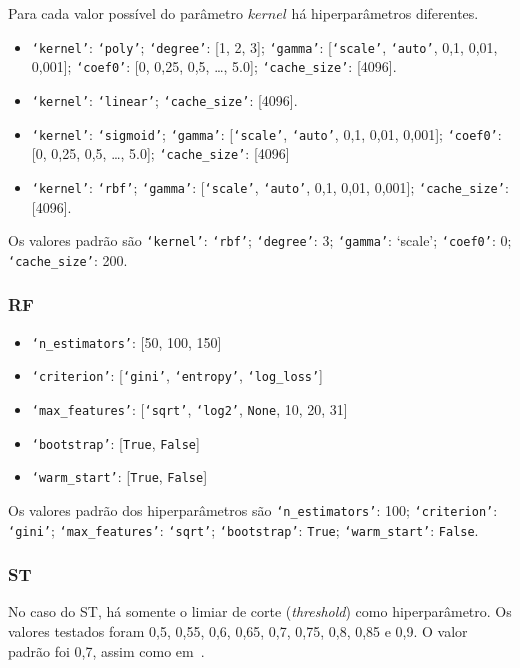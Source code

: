 Para cada valor possível do parâmetro $kernel$ há hiperparâmetros diferentes.

\SingleSpacing
\begin{itemize}
    \item \texttt{`kernel'}: \texttt{`poly'}; \texttt{`degree'}: [1, 2, 3]; \texttt{`gamma'}: [\texttt{`scale'}, \texttt{`auto'}, 0,1, 0,01, 0,001]; \texttt{`coef0'}: [0, 0,25, 0,5, \dots, 5.0]; \texttt{`cache\_size'}: [4096].
    \item \texttt{`kernel'}: \texttt{`linear'}; \texttt{`cache\_size'}: [4096].
    \item \texttt{`kernel'}: \texttt{`sigmoid'}; \texttt{`gamma'}: [\texttt{`scale'}, \texttt{`auto'}, 0,1, 0,01, 0,001]; \texttt{`coef0'}: [0, 0,25, 0,5, \dots, 5.0]; \texttt{`cache\_size'}: [4096]
    \item \texttt{`kernel'}: \texttt{`rbf'}; \texttt{`gamma'}: [\texttt{`scale'}, \texttt{`auto'}, 0,1, 0,01, 0,001]; \texttt{`cache\_size'}: [4096].
\end{itemize}
\DoubleSpacing

Os valores padrão são \texttt{`kernel'}: \texttt{`rbf'}; \texttt{`degree'}: 3; \texttt{`gamma'}: `scale'; \texttt{`coef0'}: 0; \texttt{`cache\_size'}: 200.

\subsubsection{RF}\label{subsubsec:rf_hps}

\SingleSpacing
\begin{itemize}
    \item \texttt{`n\_estimators'}: [50, 100, 150]
    \item \texttt{`criterion'}: [\texttt{`gini'}, \texttt{`entropy'}, \texttt{`log\_loss'}]
    \item \texttt{`max\_features'}: [\texttt{`sqrt'}, \texttt{`log2'}, \texttt{None}, 10, 20, 31]
    \item \texttt{`bootstrap'}: [\texttt{True}, \texttt{False}]
    \item \texttt{`warm\_start'}: [\texttt{True}, \texttt{False}]
\end{itemize}
\DoubleSpacing

Os valores padrão dos hiperparâmetros são \texttt{`n\_estimators'}: 100; \texttt{`criterion'}: \texttt{`gini'}; \texttt{`max\_features'}: \texttt{`sqrt'}; \texttt{`bootstrap'}: \texttt{True}; \texttt{`warm\_start'}: \texttt{False}.


\subsubsection{ST}\label{subsubsec:st_hps}

No caso do ST, há somente o limiar de corte (\textit{threshold}) como hiperparâmetro. Os valores testados foram 0,5, 0,55, 0,6, 0,65, 0,7, 0,75, 0,8, 0,85 e 0,9. O valor padrão foi 0,7, assim como em~\cite{MagalhaesStatistical}.
